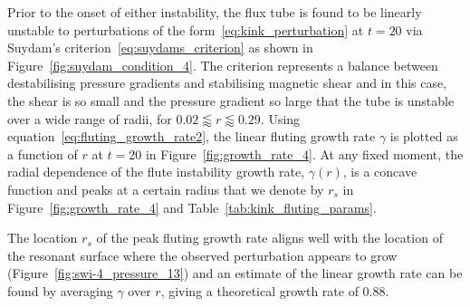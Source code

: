 \documentclass[fleqn,usenatbib]{mnras}
\newcommand{\rev}[1]{{\color{red} {#1}}}
\begin{document}
Prior to the onset of either instability, the flux tube is found to be linearly
unstable to perturbations of the form~\eqref{eq:kink_perturbation} at $t=20$
via Suydam's criterion~\eqref{eq:suydams_criterion} as shown in
Figure~\ref{fig:suydam_condition_4}. The criterion represents a
balance between destabilising pressure gradients and stabilising
magnetic shear and in this case, the shear is so small and the
pressure gradient so large that the tube is unstable over a wide range
of radii, for $ 0.02 \lessapprox r \lessapprox 0.29$.
\rev{Using equation~\eqref{eq:fluting_growth_rate2}, the} linear
fluting growth rate $\gamma$ is plotted as a function of $r$ at
$t=20$ in Figure~\ref{fig:growth_rate_4}. \rev{At any fixed moment,
the radial dependence of the flute instability growth rate, $\gamma(r)$, is a concave
function and peaks at a certain radius that we denote by $r_s$ in
Figure~\ref{fig:growth_rate_4} and Table~\ref{tab:kink_fluting_params}.}

The location \rev{$r_s$} of the peak \rev{fluting growth rate} aligns
well with the location of the resonant surface where the observed
perturbation appears to grow 
(Figure~\ref{fig:swi-4_pressure_13}) and an estimate of the linear growth rate
can be found by averaging $\gamma$ over $r$, giving a theoretical growth rate of $0.88$.
\end{document}
